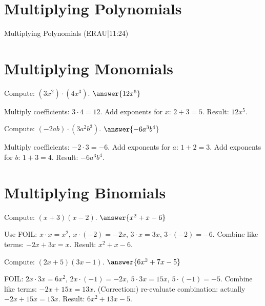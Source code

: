 \documentclass{ximera}
\begin{document}

\section*{Multiplying Polynomials}

Multiplying Polynomials (ERAU|11:24)



\section*{Multiplying Monomials}

\begin{problem}
Compute: \((3x^2)\cdot(4x^3)\). $\answer{12x^5}$
\begin{feedback}
Multiply coefficients: \(3\cdot4=12\). Add exponents for \(x\): \(2+3=5\). Result: \(12x^5\).
\end{feedback}
\end{problem}

\begin{problem}
Compute: \((-2ab)\cdot(3a^2b^3)\). $\answer{-6a^3b^4}$
\begin{feedback}
Multiply coefficients: \(-2\cdot3=-6\). Add exponents for \(a\): \(1+2=3\). Add exponents for \(b\): \(1+3=4\). Result: \(-6a^3b^4\).
\end{feedback}
\end{problem}

\section*{Multiplying Binomials}

\begin{problem}
Compute: \((x + 3)(x - 2)\). $\answer{x^2 + x - 6}$
\begin{feedback}
Use FOIL: \(x\cdot x = x^2\), \(x\cdot(-2) = -2x\), \(3\cdot x = 3x\), \(3\cdot(-2) = -6\). Combine like terms: \(-2x+3x = x\). Result: \(x^2 + x - 6\).
\end{feedback}
\end{problem}

\begin{problem}
Compute: \((2x + 5)(3x - 1)\). $\answer{6x^2 + 7x - 5}$
\begin{feedback}
FOIL: \(2x\cdot3x = 6x^2\), \(2x\cdot(-1) = -2x\), \(5\cdot3x = 15x\), \(5\cdot(-1) = -5\). Combine like terms: \(-2x+15x = 13x\). (Correction:) re-evaluate combination: actually \(-2x+15x=13x\). Result: \(6x^2 + 13x - 5\).
\end{feedback}
\end{problem}
\end{document}
